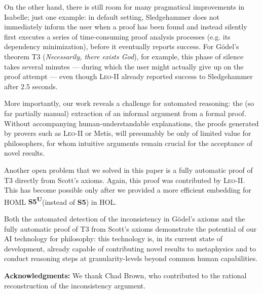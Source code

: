 \documentclass{article}
\newcommand{\logic}[1]{\textbf{#1}\xspace}
\newcommand{\SFive}{\logic{S5}}
\newcommand{\SFiveU}{\logic{S5\textsuperscript{U}}}
\begin{document}
On the other hand, there is still room for many pragmatical
improvements in Isabelle; just one example: in default setting,
Sledgehammer does not immediately inform the user when a proof has
been found and instead silently first executes a series of
time-consuming proof analysis processes (e.g. its dependency
minimization), before it eventually reports success. For G\"odel's
theorem T3 (\textit{Necessarily, there exists God}), for example, this
phase of silence takes several minutes --- during which the user might
actually give up on the proof attempt --- even though \textsc{Leo-II} already
reported success to Sledgehammer after 2.5 seconds.

More importantly, our work reveals a challenge for automated reasoning:
the (so far partially manual) extraction of an informal argument from a formal proof. 
Without accompanying human-understandable explanations,
the proofs generated by provers such as \textsc{Leo-II} or Metis, will
presumably be only of limited value for philosophers, for whom intuitive
arguments remain crucial for the acceptance of novel results.

Another open problem that we solved in this paper is a fully automatic
proof of T3 directly from Scott's axioms. Again, this proof was
contributed by \textsc{Leo-II}. This has become possible only
after we provided a more efficient embedding for HOML \SFiveU (instead of \SFive) in HOL.


Both the automated detection of the inconsistency in G\"odel's axioms
and the fully automatic proof of T3 from Scott's axioms demonstrate
the potential of our AI technology for philosophy: this technology is,
in its current state of development, already capable of contributing novel results to
metaphysics and to conduct reasoning steps at granularity-levels
beyond common human capabilities.  
\vfill

\noindent\textbf{Acknowledgments:} We thank Chad Brown, who contributed to the rational  reconstruction
of the inconsistency argument.

\pagebreak





\end{document}
